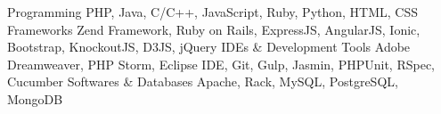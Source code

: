 \begin{cvskills}
  \cvskill
    {Programming}
    {PHP, Java, C/C++, JavaScript, Ruby, Python, HTML, CSS}
  \cvskill
  {Frameworks}
  {Zend Framework, Ruby on Rails, ExpressJS, AngularJS, Ionic, Bootstrap, KnockoutJS, D3JS, jQuery}  
  \cvskill
  {IDEs \& Development Tools}
  {Adobe Dreamweaver, PHP Storm, Eclipse IDE, Git, Gulp, Jasmin, PHPUnit, RSpec, Cucumber}  
  \cvskill
  {Softwares \& Databases}
  {Apache, Rack, MySQL, PostgreSQL, MongoDB}      
    
\end{cvskills}
